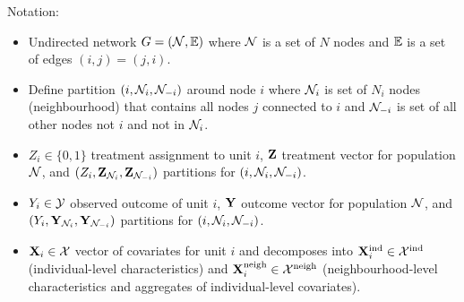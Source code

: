 \documentclass[10pt]{article}
\begin{document}
Notation:
\begin{itemize}

\item
Undirected network $G=(\mathcal{N},\mathbb{E})$ where $\mathcal{N}$ is a set of $N$ nodes and $\mathbb{E}$ is a set of edges $(i,j)=(j,i)$.

\item
Define partition $(i,\mathcal{N}_i,\mathcal{N}_{-i})$ around node $i$ where $\mathcal{N}_i$ is set of $N_i$ nodes (neighbourhood) that contains all nodes $j$ connected to $i$ and $\mathcal{N}_{-i}$ is set of all other nodes not $i$ and not in $\mathcal{N}_i$.

\item
$Z_i\in\{0,1\}$ treatment assignment to unit $i$, $\mathbf{Z}$ treatment vector for population $\mathcal{N}$, and $(Z_i,\mathbf{Z}_{\mathcal{N}_i},\mathbf{Z}_{\mathcal{N}_{-i}})$ partitions for $(i,\mathcal{N}_i,\mathcal{N}_{-i})$.

\item
$Y_i\in\mathcal{Y}$ observed outcome of unit $i$, $\mathbf{Y}$ outcome vector for population $\mathcal{N}$, and $(Y_i,\mathbf{Y}_{\mathcal{N}_i},\mathbf{Y}_{\mathcal{N}_{-i}})$ partitions for $(i,\mathcal{N}_i,\mathcal{N}_{-i})$.

\item
$\mathbf{X}_i\in\mathcal{X}$ vector of covariates for unit $i$ and decomposes into $\mathbf{X}^{\text{ind}}_i\in\mathcal{X}^\text{ind}$ (individual-level characteristics) and $\mathbf{X}^{\text{neigh}}_i\in\mathcal{X}^\text{neigh}$ (neighbourhood-level characteristics and aggregates of individual-level covariates).

\end{itemize}



\newpage

\printbibliography
\end{document}
